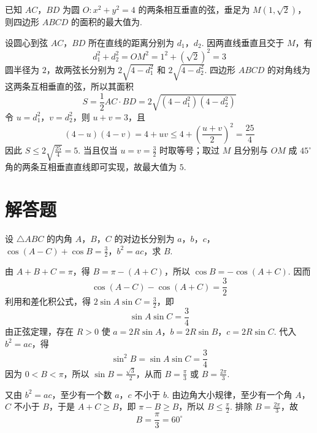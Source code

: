 \begin{problem}
已知 \(AC\)，\(BD\) 为圆 \(O: x^{2} + y^{2} = 4\) 的两条相互垂直的弦，垂足为 \(M(1, \sqrt{2})\)，则四边形 \(ABCD\) 的面积的最大值为\fillinblank{}.

\begin{solution}
设圆心到弦 \(AC\)，\(BD\) 所在直线的距离分别为 \(d_{1}\)，\(d_{2}\). 因两直线垂直且交于 \(M\)，有
\[
d_{1}^{2}+d_{2}^{2}=OM^{2}=1^{2}+\left(\sqrt2\right)^{2}=3
\]
圆半径为 \(2\)，故两弦长分别为 \(2\sqrt{4-d_{1}^{2}}\) 和 \(2\sqrt{4-d_{2}^{2}}\). 四边形 \(ABCD\) 的对角线为这两条互相垂直的弦，所以其面积
\[
S=\frac12 AC\cdot BD=2\sqrt{(4-d_{1}^{2})(4-d_{2}^{2})}
\]
令 \(u=d_{1}^{2}\)，\(v=d_{2}^{2}\)，则 \(u+v=3\)，且
\[
(4-u)(4-v)=4+uv\leqslant4+\left(\frac{u+v}{2}\right)^{2}=\frac{25}{4}
\]
因此 \(S\leqslant2\sqrt{\frac{25}{4}}=5\). 当且仅当 \(u=v=\frac32\) 时取等号；取过 \(M\) 且分别与 \(OM\) 成 \(45^{\circ}\) 角的两条互相垂直直线即可实现，故最大值为 \(5\).
\end{solution}
\end{problem}

\section{解答题}

\begin{problem}
设 \(\triangle ABC\) 的内角 \(A\)，\(B\)，\(C\) 的对边长分别为 \(a\)，\(b\)，\(c\)，\(\cos (A - C) + \cos B = \frac{3}{2}\)，\(b^2 = ac\)，求 \(B\).

\begin{solution}
由 \(A+B+C=\pi\)，得 \(B=\pi-(A+C)\)，所以 \(\cos B=-\cos(A+C)\). 因而
\[
\cos(A-C)-\cos(A+C)=\frac32
\]
利用和差化积公式，得 \(2\sin A\sin C=\frac32\)，即
\[
\sin A\sin C=\frac34
\]
由正弦定理，存在 \(R>0\) 使 \(a=2R\sin A\)，\(b=2R\sin B\)，\(c=2R\sin C\). 代入 \(b^{2}=ac\)，得
\[
\sin^{2}B=\sin A\sin C=\frac34
\]
因为 \(0<B<\pi\)，所以 \(\sin B=\frac{\sqrt3}{2}\)，从而 \(B=\frac\pi3\) 或 \(B=\frac{2\pi}{3}\).

又由 \(b^{2}=ac\)，至少有一个数 \(a\)，\(c\) 不小于 \(b\). 由边角大小规律，至少有一个角 \(A\)，\(C\) 不小于 \(B\)，于是 \(A+C\geqslant B\)，即 \(\pi-B\geqslant B\)，所以 \(B\leqslant\frac\pi2\). 排除 \(B=\frac{2\pi}{3}\)，故
\[
B=\frac\pi3=60^{\circ}
\]
\end{solution}
\end{problem}

